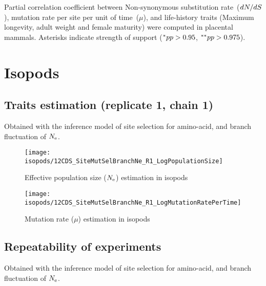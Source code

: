 \begin{table}[H]
    
    \caption[Partial correlation coefficient matrix in mammals ($\dnds$)]{
    Partial correlation coefficient between Non-synonymous \gls{substitution} rate~($\dnds$), mutation rate per site per unit of time~($\mu$), and life-history traits (Maximum longevity, adult weight and female maturity) were computed in placental mammals.
    Asterisks indicate strength of support ($\smash{^{*}} pp > 0.95$, $\smash{^{**}} pp > 0.975$).}
\end{table}


\section{Isopods}

\subsection{Traits estimation (replicate 1, chain 1)}
Obtained with the inference model of site selection for amino-acid, and branch fluctuation of $\Ne$.

\begin{figure}[H]
    \centering
    \texttt{[image: isopods/12CDS\_SiteMutSelBranchNe\_R1\_LogPopulationSize]}
    \caption[$\Ne$ estimation in isopods]{Effective population size ($\Ne$) estimation in isopods}
\end{figure}

\begin{figure}[H]
    \centering
    \texttt{[image: isopods/12CDS\_SiteMutSelBranchNe\_R1\_LogMutationRatePerTime]}
    \caption[Mutation rate estimation in isopods]{Mutation rate ($\mu$) estimation in isopods}
\end{figure}

\subsection{Repeatability of experiments}
Obtained with the inference model of site selection for amino-acid, and branch fluctuation of $\Ne$.

